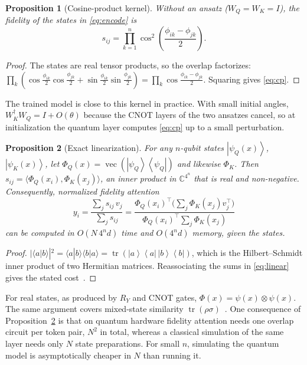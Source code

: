 \documentclass[conference]{IEEEtran}
\newtheorem{proposition}{Proposition}
\newcommand{\ket}[1]{\left|#1\right\rangle}
\newcommand{\bra}[1]{\left\langle#1\right|}
\begin{document}
\begin{proposition}[Cosine-product kernel]\label{prop:cp}
Without an ansatz ($W_Q=W_K=I$), the fidelity of the states in \eqref{eq:encode} is
\begin{equation}
s_{ij} = \prod_{k=1}^{n}\cos^2\!\left(\frac{\phi_{ik}-\phi_{jk}}{2}\right).
\label{eq:cp}
\end{equation}
\end{proposition}
\begin{proof}
The states are real tensor products, so the overlap factorizes: $\prod_k\left(\cos\frac{\phi_{ik}}{2}\cos\frac{\phi_{jk}}{2}+\sin\frac{\phi_{ik}}{2}\sin\frac{\phi_{jk}}{2}\right)=\prod_k\cos\frac{\phi_{ik}-\phi_{jk}}{2}$. Squaring gives \eqref{eq:cp}.
\end{proof}

The trained model is close to this kernel in practice. With small initial angles, $W_K^\dagger W_Q = I + O(\theta)$ because the CNOT layers of the two ansatzes cancel, so at initialization the quantum layer computes \eqref{eq:cp} up to a small perturbation.

\begin{proposition}[Exact linearization]\label{prop:lin}
For any $n$-qubit states $\ket{\psi_Q(x)}$, $\ket{\psi_K(x)}$, let $\Phi_Q(x)=\operatorname{vec}(\ket{\psi_Q}\!\bra{\psi_Q})$ and likewise $\Phi_K$. Then $s_{ij}=\langle\Phi_Q(x_i),\Phi_K(x_j)\rangle$, an inner product in $\mathbb{C}^{4^n}$ that is real and non-negative. Consequently, normalized fidelity attention
\begin{equation}
y_i=\frac{\sum_j s_{ij}\,v_j}{\sum_j s_{ij}}=\frac{\Phi_Q(x_i)^{\!\top}\big(\sum_j \Phi_K(x_j)v_j^\top\big)}{\Phi_Q(x_i)^{\!\top}\sum_j \Phi_K(x_j)}
\label{eq:linear}
\end{equation}
can be computed in $O(N\,4^n d)$ time and $O(4^n d)$ memory, given the states.
\end{proposition}
\begin{proof}
$|\langle a|b\rangle|^2=\langle a|b\rangle\langle b|a\rangle=\operatorname{tr}(\ket{a}\!\bra{a}\,\ket{b}\!\bra{b})$, which is the Hilbert--Schmidt inner product of two Hermitian matrices. Reassociating the sums in \eqref{eq:linear} gives the stated cost~\cite{katharopoulos2020linear}.
\end{proof}

For real states, as produced by $R_Y$ and CNOT gates, $\Phi(x)=\psi(x)\otimes\psi(x)$. The same argument covers mixed-state similarity $\operatorname{tr}(\rho\sigma)$~\cite{chen2024qmsan}. One consequence of Proposition~\ref{prop:lin} is that on quantum hardware fidelity attention needs one overlap circuit per token pair, $N^2$ in total, whereas a classical simulation of the same layer needs only $N$ state preparations. For small $n$, simulating the quantum model is asymptotically cheaper in $N$ than running it.
\end{document}
